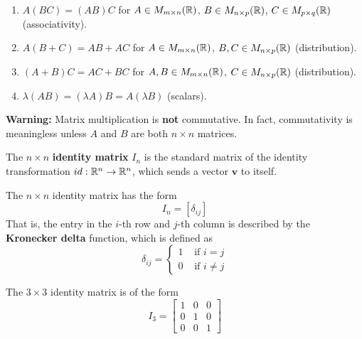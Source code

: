 \begin{theorem}
    
    \begin{enumerate}
        \item $A(BC) = (AB)C$ for $A \in M_{m \times n}(\mathbb{R})$, $B \in M_{n \times p}(\mathbb{R})$, $C \in M_{p \times q}(\mathbb{R})$ (associativity).
        \item $A (B + C) = AB + AC$ for $A \in M_{m \times n}(\mathbb{R})$, $B,C \in M_{n \times p}(\mathbb{R})$ (distribution).
        \item $(A + B) C = AC + BC$ for $A,B \in M_{m \times n}(\mathbb{R})$, $C \in M_{n \times p}(\mathbb{R})$ (distribution).
        \item $\lambda(AB) = (\lambda A) B = A (\lambda B)$ (scalars).
        
    \end{enumerate}
    
    \end{theorem}

\begin{example}
    \textbf{Warning:}  Matrix multiplication is \textbf{not} commutative. In fact, commutativity is meaningless unless $A$ and $B$ are both $n \times n$ matrices.
\end{example}


\begin{definition}\label{identitymatrix}
    The $n \times n$ \textbf{identity matrix} $I_n$ is the standard matrix of the identity transformation $id : \mathbb{R}^n \to \mathbb{R}^n$, which sends a vector $\bm{v}$ to itself.
    
    The $n \times n$ identity matrix has the form $$I_n = \left[\delta_{ij}\right]$$
    That is, the entry in the $i$-th row and $j$-th column is described by the \textbf{Kronecker delta} function, which is defined as $$\delta_{ij} = \left\{
		\begin{array}{ll}
			1 & \text{ if } i = j \\
			0 & \text{ if } i \neq j
		\end{array}
		\right.$$
    
\end{definition}

\begin{example}
    The $3 \times 3$ identity matrix is of the form  \begin{equation*}
I_3 = 
\begin{bmatrix}
1 & 0  & 0 \\
0 & 1  & 0 \\
0 & 0  & 1
\end{bmatrix}
\end{equation*}
\end{example}


